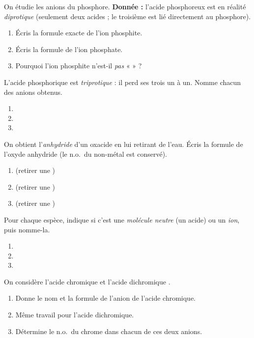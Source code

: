 \documentclass[11pt,a4paper]{article}
\begin{document}
\begin{exo}
On étudie les anions du phosphore. \textbf{Donnée :} l'acide phosphoreux  est en réalité
\emph{diprotique} (seulement deux  acides ; le troisième est lié directement au phosphore).
\begin{enumerate}[label=\alph*)]
  \item Écris la formule exacte de l'ion phosphite.
  \item Écris la formule de l'ion phosphate.
  \item Pourquoi l'ion phosphite n'est-il \emph{pas} «  » ?
\end{enumerate}
\end{exo}

\begin{exo}
L'acide phosphorique  est \emph{triprotique} : il perd ses trois  un à un. Nomme chacun des
anions obtenus.
\begin{enumerate}[label=\alph*)]
  \item {}
  \item {}
  \item {}
\end{enumerate}
\end{exo}

\begin{exo}
On obtient l'\emph{anhydride} d'un oxacide en lui retirant de l'eau. Écris la formule de l'oxyde anhydride
(le n.o.\ du non-métal est conservé).
\begin{enumerate}[label=\alph*)]
  \item {} (retirer une )
  \item {} (retirer une )
  \item {} (retirer une )
\end{enumerate}
\end{exo}

\begin{exo}
Pour chaque espèce, indique si c'est une \emph{molécule neutre} (un acide) ou un \emph{ion}, puis nomme-la.
\begin{enumerate}[label=\alph*)]
  \item {}
  \item {}
  \item {}
\end{enumerate}
\end{exo}

\begin{exo}
On considère l'acide chromique  et l'acide dichromique .
\begin{enumerate}[label=\alph*)]
  \item Donne le nom et la formule de l'anion de l'acide chromique.
  \item Même travail pour l'acide dichromique.
  \item Détermine le n.o.\ du chrome dans chacun de ces deux anions.
\end{enumerate}
\end{exo}
\end{document}
